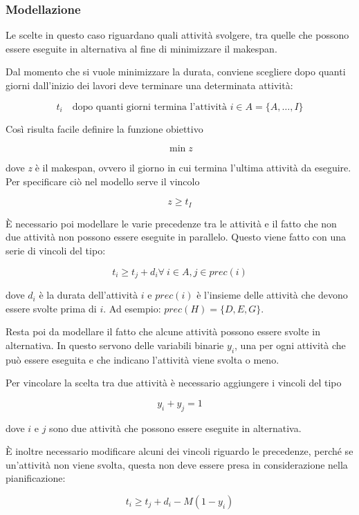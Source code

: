 \subsubsection{Modellazione}

Le scelte in questo caso riguardano quali attività svolgere, tra quelle che possono essere eseguite in alternativa al fine di minimizzare il makespan.

Dal momento che si vuole minimizzare la durata, conviene scegliere dopo quanti giorni dall'inizio dei lavori deve terminare una determinata attività:

$$
t_i \quad \text{dopo quanti giorni termina l'attività }i \in A = \{A, \ldots, I \}
$$

\noindent Così risulta facile definire la funzione obiettivo

$$
\min z
$$

\noindent dove \textit{z} è il makespan, ovvero il giorno in cui termina l'ultima attività da eseguire. Per specificare ciò nel modello serve il vincolo

$$
z \geq t_I
$$

\noindent \`E necessario poi modellare le varie precedenze tra le attività e il fatto che non due attività non possono essere eseguite in parallelo.
Questo viene fatto con una serie di vincoli del tipo:

$$
t_i \geq t_{j} + d_{i} \forall \: i \in A, j \in prec(i)
$$

\noindent dove $d_i$ è la durata dell'attività $i$ e $prec(i)$ è l'insieme delle attività che devono essere svolte prima di $i$. Ad esempio: $prec(H) = \{D,E,G\}$.

Resta poi da modellare il fatto che alcune attività possono essere svolte in alternativa. In questo servono delle variabili binarie $y_i$, una per ogni attività che può essere eseguita e che indicano l'attività viene svolta o meno.

Per vincolare la scelta tra due attività è necessario aggiungere i vincoli del tipo

$$
y_i + y_j = 1
$$

\noindent dove $i$ e $j$ sono due attività che possono essere eseguite in alternativa.

\`E inoltre necessario modificare alcuni dei vincoli riguardo le precedenze, perché se un'attività non viene svolta, questa non deve essere presa in considerazione nella pianificazione:

$$
t_i \geq t_{j} + d_i - M(1 - y_i)
$$ 

